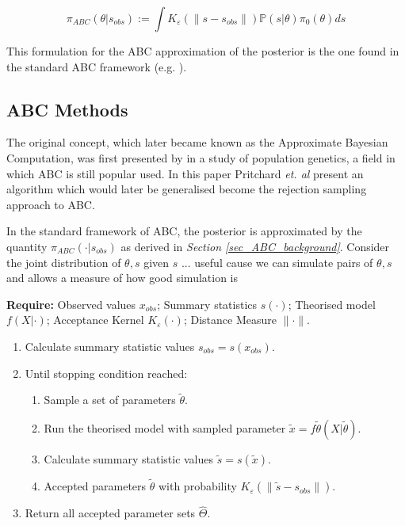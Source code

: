 \documentclass[bibliography=totoc,11pt,a4paper,margin=0]{article}
\newcommand*{\prob}{\mathbb{P}}
\theoremstyle{break}
\begin{document}
  \[ \pi_{ABC}(\theta|s_{obs}):=\int K_\varepsilon(\|s-s_{obs}\|)\prob(s|\theta)\pi_0(\theta)ds \]

  This formulation for the ABC approximation of the posterior is the one found in the standard ABC framework (e.g. \cite[]{overview_of_abc,annual_review_of_statistics_ABC}).

\subsection{ABC Methods}\label{sec_ABC_ABC_methods}

  \par The original concept, which later became known as the Approximate Bayesian Computation, was first presented by \cite[]{population_growth_of_human_Y_chromosomes} in a study of population genetics, a field in which ABC is still popular used. In this paper Pritchard \textit{et. al} present an algorithm which would later be generalised become the rejection sampling approach to ABC.

  \par In the standard framework of ABC, the posterior is approximated by the quantity $\pi_{ABC}(\cdot|s_{obs})$ as derived in \textit{Section \ref{sec_ABC_background}}. Consider the joint distribution of $\theta,s$ given $s$ ... useful cause we can simulate pairs of $\theta,s$ and allows a measure of how good simulation is

  \begin{box_algorithm}\label{alg_generic_abc}
    \textbf{Require:} Observed values $x_{obs}$; Summary statistics $s(\cdot)$; Theorised model $f(X|\cdot)$; Acceptance Kernel $K_\varepsilon(\cdot)$; Distance Measure $\|\cdot\|$.
    \begin{enumerate}
      \item Calculate summary statistic values $s_{obs}=s(x_{obs})$.
      \item Until stopping condition reached:
      \begin{enumerate}
        \item Sample a set of parameters $\tilde\theta$.
        \item Run the theorised model with sampled parameter $\tilde{x}=f\tilde\theta(X|\tilde\theta)$.
        \item Calculate summary statistic values $\tilde{s}=s(\tilde{x})$.
        \item Accepted parameters $\tilde\theta$ with probability $K_\varepsilon(\|\tilde{s}-s_{obs}\|)$.
      \end{enumerate}
      \item Return all accepted parameter sets $\hat\Theta$.
    \end{enumerate}
  \end{box_algorithm}
\end{document}
